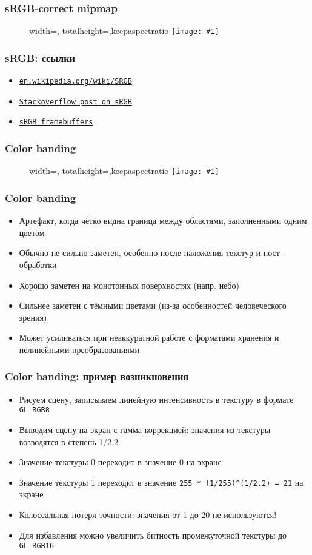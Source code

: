 \documentclass{beamer}
\newcommand{\slideimage}[1]{
  \begin{figure}
    \begin{adjustbox}{width=\textwidth, totalheight=\textheight-2\baselineskip-2\baselineskip,keepaspectratio}
      \texttt{[image: \#1]}
    \end{adjustbox}
  \end{figure}
}
\begin{document}
\begin{frame}[fragile]
\frametitle{sRGB-correct mipmap}
\slideimage{srgb-mipmap.png}
\end{frame}

\begin{frame}[fragile]
\frametitle{sRGB: ссылки}
\begin{itemize}
\item \href{https://en.wikipedia.org/wiki/SRGB}{\nolinkurl{en.wikipedia.org/wiki/SRGB}}
\item \href{https://stackoverflow.com/a/12894053/2315602}{\nolinkurl{Stackoverflow post on sRGB}}
\item \href{https://www.khronos.org/opengl/wiki/Framebuffer#Colorspace}{\nolinkurl{sRGB framebuffers}}
\end{itemize}
\end{frame}

\begin{frame}[fragile]
\frametitle{Color banding}
\slideimage{banding.jpg}
\end{frame}

\begin{frame}[fragile]
\frametitle{Color banding}
\begin{itemize}
\item Артефакт, когда чётко видна граница между областями, заполненными одним цветом
\pause
\item Обычно не сильно заметен, особенно после наложения текстур и пост-обработки
\pause
\item Хорошо заметен на монотонных поверхностях (напр. небо)
\pause
\item Сильнее заметен с тёмными цветами (из-за особенностей человеческого зрения)
\pause
\item Может усиливаться при неаккуратной работе с форматами хранения и нелинейными преобразованиями
\end{itemize}
\end{frame}

\begin{frame}[fragile]
\frametitle{Color banding: пример возникновения}
\begin{itemize}
\item Рисуем сцену, записываем линейную интенсивность в текстуру в формате \verb|GL_RGB8|
\pause
\item Выводим сцену на экран с гамма-коррекцией: значения из текстуры возводятся в степень 1/2.2
\pause
\item Значение текстуры 0 переходит в значение 0 на экране
\pause
\item Значение текстуры 1 переходит в значение \verb|255 * (1/255)^(1/2.2) = 21| на экране
\pause
\item Колоссальная потеря точности: значения от 1 до 20 не используются!
\pause
\item Для избавления можно увеличить битность промежуточной текстуры до \verb|GL_RGB16|
\end{itemize}
\end{frame}
\end{document}
